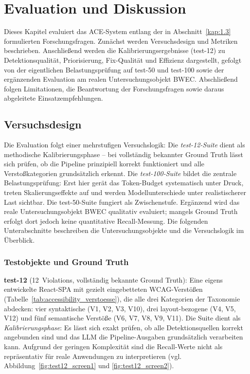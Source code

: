 \chapter{Evaluation und Diskussion} \label{kap:7}

Dieses Kapitel evaluiert das \ac{ACE}-System entlang der in Abschnitt~\ref{kap:1.3} formulierten Forschungsfragen. Zunächst werden Versuchsdesign und Metriken beschrieben. Anschließend werden die Kalibrierungsergebnisse (test-12) zu Detektionsqualität, Priorisierung, Fix-Qualität und \mbox{Effizienz} dargestellt, gefolgt von der eigentlichen Belastungsprüfung auf test-50 und test-100 sowie der ergänzenden Evaluation am realen Untersuchungsobjekt \ac{BWEC}. Abschließend folgen Limitationen, die Beantwortung der Forschungsfragen sowie daraus abgeleitete Einsatzempfehlungen.

\section{Versuchsdesign}
\label{sec:versuchsdesign}

Die Evaluation folgt einer mehrstufigen Versuchslogik: Die \textit{test-12-Suite} dient als methodische Kalibrierungsphase -- bei vollständig bekannter Ground Truth lässt sich prüfen, ob die Pipeline prinzipiell korrekt funktioniert und alle Verstoßkategorien grundsätzlich erkennt. Die \textit{test-100-Suite} bildet die zentrale Belastungsprüfung: Erst hier gerät das Token-Budget systematisch unter Druck, treten Skalierungseffekte auf und werden Modellunterschiede unter realistischerer Last sichtbar. Die test-50-Suite fungiert als Zwischenstufe. Ergänzend wird das reale Untersuchungsobjekt \ac{BWEC} qualitativ evaluiert; mangels Ground Truth erfolgt dort jedoch keine quantitative Recall-Messung. Die folgenden Unterabschnitte beschreiben die Untersuchungsobjekte und die Versuchslogik im Überblick.

\subsection{Testobjekte und Ground Truth}
\label{sec:versuch_testobjekt}

\textbf{test-12} (12~Violations, vollständig bekannte Ground Truth): Eine eigens entwickelte React-\ac{SPA} mit gezielt eingebetteten \ac{WCAG}-Verstößen (Tabelle~\ref{tab:accessibility_verstoesse}), die alle drei Kategorien der Taxonomie abdecken: vier syntaktische (V1, V2, V3, V10), drei layout-bezogene (V4, V5, V12) und fünf semantische Verstöße (V6, V7, V8, V9, V11). Die Suite dient als \textit{Kalibrierungsphase}: Es lässt sich exakt prüfen, ob alle Detektionsquellen korrekt angebunden sind und das \ac{LLM} die Pipeline-Ausgaben grundsätzlich verarbeiten kann. Aufgrund der geringen Komplexität sind die Recall-Werte nicht als repräsentativ für reale Anwendungen zu interpretieren (vgl. Abbildung~\ref{fig:test12_screen1} und \ref{fig:test12_screen2}).

